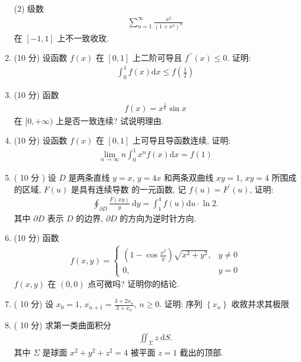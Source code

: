 \documentclass[space]{ctexart} %
\def\geq{\geqslant}
\def\leq{\leqslant}
\begin{document}
\begin{enumerate}[itemsep=1.2em,label=\arabic*.,topsep=0pt,left=0em]
 (2)  级数
\begin{align*}
\sum_{n=1}^{\infty} \frac{x^{2}}{\left(1+x^{2}\right)^{n}}
\end{align*}
在 $ [-1,1] $ 上不一致收玫.

\item  (10 分)  设函数 $ f(x) $ 在 $ [0,1] $ 上二阶可导且 $ f^{\prime \prime}(x) \leq 0 $.  证明:
\begin{align*}
\int_{0}^{1} f(x) \mathrm{d} x \leq f\left(\frac{1}{2}\right)
\end{align*}

\item  (10 分) 函数
\begin{align*}
f(x)=x^{\frac{1}{8}} \sin x
\end{align*}
在 $ [0,+\infty) $ 上是否一致连续? 试说明理由.
\item  (10  分)  设函数  $f(x)$  在  $[0,1]$  上可导且导函数连续, 证明:
\begin{align*}
\lim _{n \rightarrow \infty} n \int_{0}^{1} x^{n} f(x) \mathrm{d} x=f(1)
\end{align*}

\item   ( 10 分  )  设 $ D $ 是两条直线 $ y=x$, $y=4 x $ 和两条双曲线  $x y=1$, $x y=4$  所围成的区域,  $F(u) $ 是具有连续导数 的一元函数, 记 $ f(u)=F^{\prime}(u) $, 证明:
\begin{align*}
\oint_{\partial D} \frac{F(x y)}{y} \mathrm{~d} y=\int_{1}^{4} f(u) \mathrm{d} u \cdot \ln 2 .
\end{align*}
其中 $ \partial D $ 表示 $ D $ 的边界, $ \partial D $ 的方向为逆时针方向.
\item   (10 分) 函数
\begin{align*}
f(x, y)=\begin{cases}
\left(1-\cos \frac{x^{2}}{y}\right) \sqrt{x^{2}+y^{2}}, & y \neq 0 \\
0, & y=0
\end{cases}
\end{align*}
 $f(x, y) $ 在 $ (0,0) $ 点可微吗? 证明你的结论.

 \item   ( 10 分)  设 $ x_{0}=1$, $x_{n+1}=\frac{3+2 x_{n}}{3+x_{n}}$, $n \geq 0 $.  证明: 序列  $\left\{x_{n}\right\}$  收敘并求其极限

\item   ( 10 分)  求第一类曲面积分
\begin{align*}
\iint_{\Sigma} z \mathrm{~d} S .
\end{align*}
其中 $ \Sigma $ 是球面 $ x^{2}+y^{2}+z^{2}=4$  被平面 $ z=1 $ 截出的顶部.
\newpage


\end{enumerate}
\end{document}
